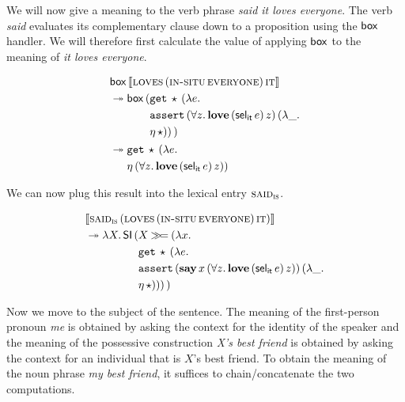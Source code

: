 We will now give a meaning to the verb phrase \emph{said it loves
  everyone}. The verb \emph{said} evaluates its complementary clause down
to a proposition using the $\mathsf{box}$ handler. We will therefore first
calculate the value of applying $\mathsf{box}$ to the meaning of \emph{it loves
  everyone}.

\begin{align*}
  &\mathsf{box}\,\llbracket \textsc{loves}\,(\textsc{in-situ}\,\textsc{everyone})\,\textsc{it} \rrbracket \\
  &\twoheadrightarrow \mathsf{box}\,(\begin{aligned}[t]
      &\mathtt{get}\,\star\,(\lambda e.\,  \\
      &\mathtt{assert}\,(\forall z.\, \textbf{love}\,(\mathsf{sel}_{\mathsf{it}}\,e)\,z)\,(\lambda \_.\,  \\
      &\eta\,\star))\,)
    \end{aligned} \\
  &\twoheadrightarrow \begin{aligned}[t]
      &\mathtt{get}\,\star\,(\lambda e.\,  \\
      &\eta\,(\forall z.\, \textbf{love}\,(\mathsf{sel}_{\mathsf{it}}\,e)\,z))
    \end{aligned}
\end{align*}

We can now plug this result into the lexical entry $\textsc{said}_{\textsc{is}}$.

\begin{align*}
  &\llbracket \textsc{said}_{\textsc{is}}\,(\textsc{loves}\,(\textsc{in-situ}\,\textsc{everyone})\,\textsc{it}) \rrbracket \\
  &\twoheadrightarrow \lambda X.\, \mathsf{SI}\,(\begin{aligned}[t]
        &X \mathbin{\gg\!=} (\lambda x.\,  \\
        &\mathtt{get}\,\star\,(\lambda e.\,  \\
        &\mathtt{assert}\,(\textbf{say}\,x\,(\forall z.\, \textbf{love}\,(\mathsf{sel}_{\mathsf{it}}\,e)\,z))\,(\lambda \_.\,  \\
        &\eta\,\star)))\,)
      \end{aligned}
\end{align*}

Now we move to the subject of the sentence. The meaning of the first-person
pronoun \emph{me} is obtained by asking the context for the identity of the
speaker and the meaning of the possessive construction \emph{X's best
  friend} is obtained by asking the context for an individual that is $X$'s
best friend. To obtain the meaning of the noun phrase \emph{my best
  friend}, it suffices to chain/concatenate the two computations.

